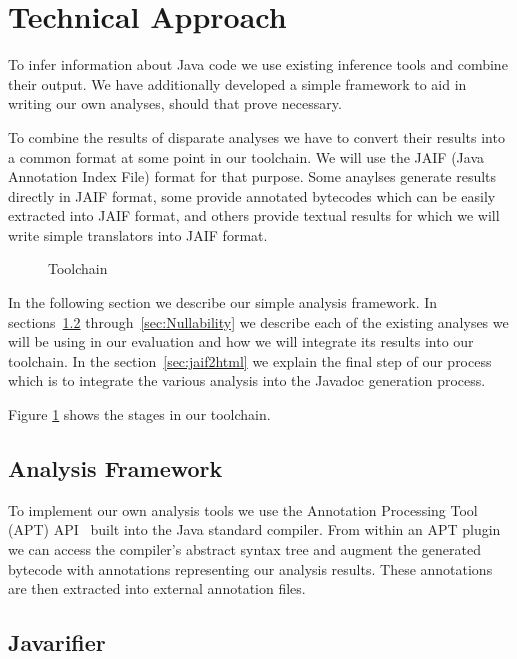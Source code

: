 \section{Technical Approach}
To infer information about Java code we use existing inference tools and
combine their output. We have additionally developed a simple framework to aid
in writing our own analyses, should that prove necessary.

To combine the results of disparate analyses we have to convert their results
into a common format at some point in our toolchain.  We will use the JAIF
(Java Annotation Index File) format for that purpose.  Some anaylses generate
results directly in JAIF format, some provide annotated bytecodes which can be
easily extracted into JAIF format, and others provide textual results for which
we will write simple translators into JAIF format.

\begin{figure}
\centering
{}
\caption{Toolchain}
\label{fig:toolchain}
\end{figure}

In the following section we describe our simple analysis framework.  In
sections~\ref{sec:Javarifier} through~\ref{sec:Nullability} we describe each of
the existing analyses we will be using in our evaluation and how we will
integrate its results into our toolchain. In the section~\ref{sec:jaif2html} we
explain the final step of our process which is to integrate the various
analysis into the Javadoc generation process.

Figure \ref{fig:toolchain} shows the stages in our toolchain.

\subsection{Analysis Framework}
\label{ss:analysisFramework}

To implement our own analysis tools we use the Annotation Processing Tool (APT)
API~\cite{apt} built into the Java standard compiler.  From within an APT plugin
we can access the compiler's abstract syntax tree and augment the generated
bytecode with annotations representing our analysis results. These annotations
are then extracted into external annotation files.

\subsection{Javarifier}
\label{sec:Javarifier}

